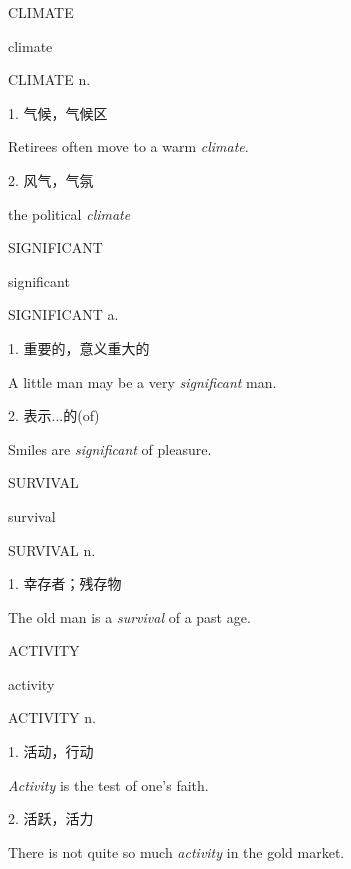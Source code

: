 \begin{flashcard}{
CLIMATE

climate
}
\begin{center}
CLIMATE n. 
\end{center}
1. 气候，气候区

Retirees often move to a warm \textit{climate}.

2. 风气，气氛

the political \textit{climate}

\end{flashcard}
\begin{flashcard}{
SIGNIFICANT

significant
}
\begin{center}
SIGNIFICANT a. 
\end{center}
1. 重要的，意义重大的

A little man may be a very \textit{significant} man.

2. 表示...的(of)

Smiles are \textit{significant} of pleasure.

\end{flashcard}
\begin{flashcard}{
SURVIVAL

survival
}
\begin{center}
SURVIVAL n. 
\end{center}
1. 幸存者；残存物

The old man is a \textit{survival} of a past age.

\end{flashcard}
\begin{flashcard}{
ACTIVITY

activity
}
\begin{center}
ACTIVITY n. 
\end{center}
1. 活动，行动

\textit{Activity} is the test of one's faith.

2. 活跃，活力

There is not quite so much \textit{activity} in the gold market.

\end{flashcard}
